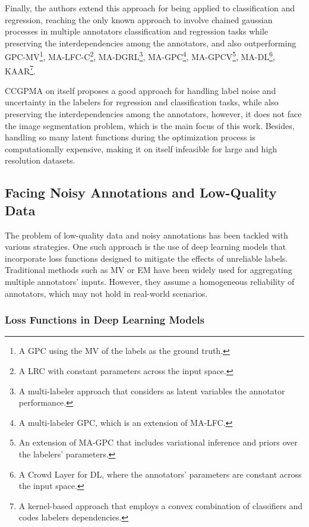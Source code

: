 Finally, the authors extend this approach for being applied to
classification and regression, reaching the only known approach to
involve chained gaussian processes in multiple annotators
classification and regression tasks while preserving the
interdependencies among the annotators, and also outperforming
GPC-MV\footnote{A GPC using the MV of the labels as the ground truth.},
MA-LFC-C\footnote{A LRC with constant parameters across the input space.},
MA-DGRL\footnote{A multi-labeler approach that considers as latent
variables the annotator performance.},
MA-GPC\footnote{A multi-labeler GPC, which is an extension of MA-LFC.},
MA-GPCV\footnote{An extension of MA-GPC that includes variational
inference and priors over the labelers' parameters.},
MA-DL\footnote{A Crowd Layer for DL, where the annotators' parameters
are constant across the input space.},
KAAR\footnote{A kernel-based approach that employs a convex
combination of classifiers and codes labelers dependencies.}.

\gls{CCGPMA} on itself proposes a good approach for handling label
noise and uncertainty in the labelers for regression and
classification tasks, while also preserving the interdependencies
among the annotators, however, it does not face the image
segmentation problem, which is the main focus of this
work. Besides, handling so many latent functions during the
optimization process is computationally expensive, making it on itself
infeasible for large and high resolution datasets.

\subsection{Facing Noisy Annotations and Low-Quality Data}

The problem of low-quality data and noisy annotations has been
tackled with various strategies. One such approach is the use of deep
learning models that incorporate loss functions designed to mitigate
the effects of unreliable labels. Traditional methods such as
\gls{MV} or \gls{EM} have been widely used for aggregating multiple
annotators' inputs. However, they assume a homogeneous reliability of
annotators, which may not hold in real-world scenarios.

\subsubsection{Loss Functions in Deep Learning Models}

